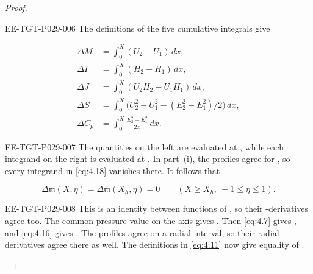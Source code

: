\begin{proof}
\begin{EESegment}{EE-TGT-P029-006}
The definitions of the five cumulative integrals give
\end{EESegment}
\begin{equation}
\begin{aligned}
 \Delta M&=\int_0^X(U_2-U_1)\,dx,\\
 \Delta I&=\int_0^X(H_2-H_1)\,dx,\\
 \Delta J&=\int_0^X(U_2H_2-U_1H_1)\,dx,\\
 \Delta S&=\int_0^X\bigl(U_2^2-U_1^2-(E_2^2-E_1^2)/2\bigr)\,dx,\\
 \Delta C_p&=\int_0^X\frac{E_2^2-E_1^2}{2x}\,dx.
\end{aligned}
\tag{4.18}\label{eq:4.18}
\end{equation}
\begin{EESegment}{EE-TGT-P029-007}
The quantities on the left are evaluated at
, while each integrand on the right is evaluated
at . In part~\textup{(i)}, the profiles
 agree for
, so every integrand in \eqref{eq:4.18}
vanishes there. It follows that
\end{EESegment}
\[
 \Delta\mathfrak m(X,\eta)=\Delta\mathfrak m(X_h,\eta)=0
 \qquad(X\geq X_h,\ -1\leq\eta\leq1).
\]
\begin{EESegment}{EE-TGT-P029-008}
This is an identity between functions of , so their
-derivatives agree too. The common pressure value
on the axis gives . Then
\eqref{eq:4.7} gives , and \eqref{eq:4.16}
gives . The profiles agree on a
radial interval, so their radial derivatives agree there as well. The
definitions in \eqref{eq:4.11} now give equality of
.
\end{EESegment}


\end{proof}
